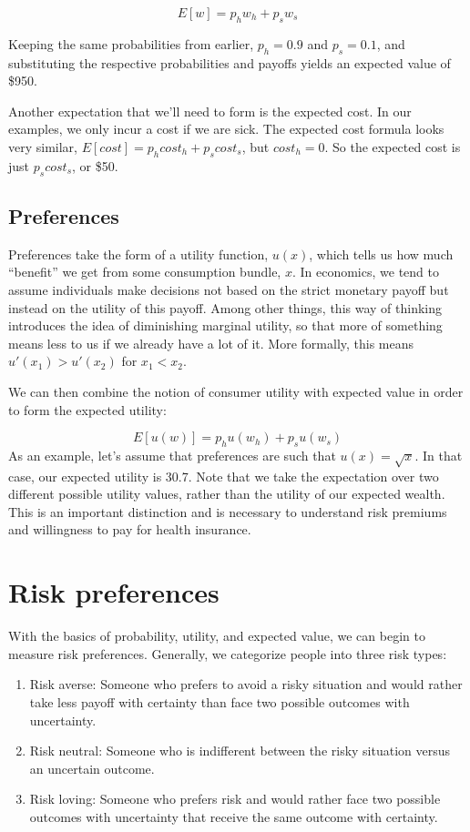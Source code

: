 \documentclass[
  letterpaper,
  DIV=11,
  numbers=noendperiod]{scrreport}
\providecommand{\tightlist}{%
  \setlength{\itemsep}{0pt}\setlength{\parskip}{0pt}}\usepackage{longtable,booktabs,array}
\theoremstyle{definition}
\theoremstyle{remark}
\begin{document}
\[E[w] = p_{h}w_{h} + p_{s}w_{s}\]

Keeping the same probabilities from earlier, \(p_{h}=0.9\) and
\(p_{s}=0.1\), and substituting the respective probabilities and payoffs
yields an expected value of \$950.

Another expectation that we'll need to form is the expected cost. In our
examples, we only incur a cost if we are sick. The expected cost formula
looks very similar, \(E[cost]=p_{h}cost_{h} + p_{s}cost_{s}\), but
\(cost_{h}=0\). So the expected cost is just \(p_{s}cost_{s}\), or \$50.

\hypertarget{preferences}{%
\subsection*{Preferences}\label{preferences}}

Preferences take the form of a utility function, \(u(x)\), which tells
us how much ``benefit'' we get from some consumption bundle, \(x\). In
economics, we tend to assume individuals make decisions not based on the
strict monetary payoff but instead on the utility of this payoff. Among
other things, this way of thinking introduces the idea of diminishing
marginal utility, so that more of something means less to us if we
already have a lot of it. More formally, this means
\(u'(x_{1})>u'(x_{2})\) for \(x_{1}<x_{2}\).

We can then combine the notion of consumer utility with expected value
in order to form the expected utility:

\[E[u(w)]=p_{h}u(w_{h}) + p_{s}u(w_{s})\] As an example, let's assume
that preferences are such that \(u(x)=\sqrt x\). In that case, our
expected utility is 30.7. Note that we take the expectation over two
different possible utility values, rather than the utility of our
expected wealth. This is an important distinction and is necessary to
understand risk premiums and willingness to pay for health insurance.

\hypertarget{risk-preferences}{%
\section{Risk preferences}\label{risk-preferences}}

With the basics of probability, utility, and expected value, we can
begin to measure risk preferences. Generally, we categorize people into
three risk types:

\begin{enumerate}
\def\labelenumi{\arabic{enumi}.}
\tightlist
\item
  Risk averse: Someone who prefers to avoid a risky situation and would
  rather take less payoff with certainty than face two possible outcomes
  with uncertainty.
\item
  Risk neutral: Someone who is indifferent between the risky situation
  versus an uncertain outcome.
\item
  Risk loving: Someone who prefers risk and would rather face two
  possible outcomes with uncertainty that receive the same outcome with
  certainty.
\end{enumerate}
\end{document}
